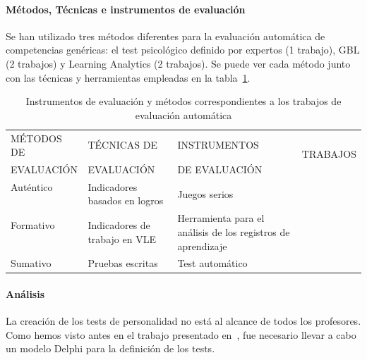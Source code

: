 \paragraph*{Métodos, Técnicas e instrumentos de evaluación}
Se han utilizado tres métodos diferentes para la evaluación automática de competencias genéricas: el test psicológico definido por expertos (1 trabajo), GBL (2 trabajos) y Learning Analytics (2 trabajos). Se puede ver cada método junto con las técnicas y herramientas empleadas en la tabla~\ref{tab:MetodosAutomaticos}.

\begin{table}
  \begin{center}
  \begin{tabular}{| m{2.7cm} | m{2.9cm} | m{4cm} | m{2cm} |}
    \hline 
    MÉTODOS DE  & TÉCNICAS DE  & INSTRUMENTOS  & \multirow{2}{*}{TRABAJOS} \\
    EVALUACIÓN & EVALUACIÓN & DE EVALUACIÓN &  \\
    \hline
    \hline
    Auténtico  & \multirow{2}{3cm}{Indicadores basados en logros} & \multirow{2}{*}{Juegos serios} & \cite{bedek2011behavioral} \\
    \cline{1-1} \cline{4-4}
    \multirow{4}{*}{Formativo} &  &  & \cite{guenaga2013serious} \\
    \cline{2-4}
     & \multirow{3}{2.9cm}{Indicadores de trabajo en VLE} & \multirow{3}{4cm}{Herramienta para el análisis de los registros de aprendizaje} & \multirow{3}{*}{\cite{fidalgo:2015,rayon2014web}} \\
     &  &  &  \\
     &  &  &  \\
    \hline
    Sumativo & Pruebas escritas & Test automático & \cite{andre2011formal} \\
    \hline
  \end{tabular}
\end{center}
\caption{Instrumentos de evaluación y métodos correspondientes a los trabajos de evaluación automática}
\label{tab:MetodosAutomaticos}
\end{table} 


\paragraph*{Análisis}
La creación de los  tests de personalidad no está al alcance de todos los profesores. Como hemos visto antes en el trabajo presentado en~\cite{andre2011formal}, fue necesario llevar a cabo un modelo Delphi para la definición de los tests.

